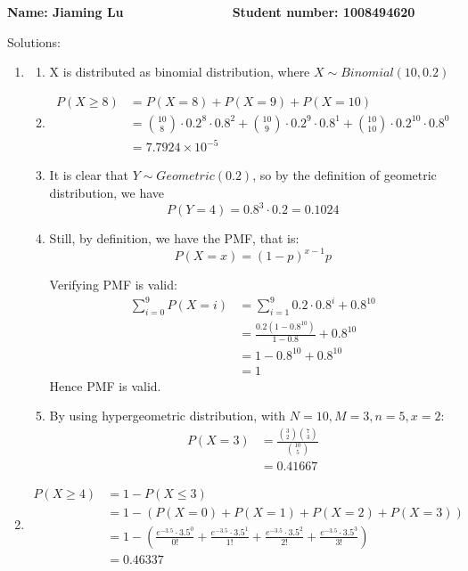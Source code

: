 \documentclass[a4paper, 12pt]{article}
\begin{document}
\textbf{Name: Jiaming Lu $~~~~~~~~~~~~~~~~~~~~~~~~~
~~~~~~~~~~~$ Student number: 1008494620}

Solutions:
\begin{enumerate}
	\item 
\begin{enumerate}
	\item
		X is distributed as binomial distribution, where $X\sim Binomial(10,0.2)$
	\item 
		$$\begin{aligned}
			P(X\geq 8) &= P(X = 8) + P(X = 9) + P(X = 10)\\
					   &= \binom{10}{8}\cdot 0.2^8\cdot0.8^2 + 
					   \binom{10}{9}\cdot 0.2^9\cdot0.8^1 +
					   \binom{10}{10}\cdot 0.2^{10}\cdot0.8^0\\
					   &= 7.7924\times 10^{-5}
		\end{aligned}$$
	\item 
		It is clear that $Y\sim Geometric(0.2)$, so by the definition of 
		geometric distribution, we have
		$$P(Y= 4) = 0.8^3\cdot 0.2 =0.1024$$
	\item 
		Still, by definition, we have the PMF, that is:
		$$P(X = x) = (1-p)^{x-1}p$$

		Verifying PMF is valid:
		$$\begin{aligned}
			\sum^{9}_{i = 0}P(X = i)
			&= \sum^{9}_{i = 1}0.2\cdot 0.8^i + 0.8^{10}\\
			&= \frac{0.2(1-0.8^10)}{1-0.8} + 0.8^{10}\\
			&= 1-0.8^{10} + 0.8^{10}\\
			&= 1
		\end{aligned}$$
		Hence PMF is valid.
	\item
		By using hypergeometric distribution, with $N=10,M=3,n=5,x=2$:
		$$\begin{aligned}
			P(X=3)&= \frac{\binom{3}{2}\binom{7}{3}}{\binom{10}{5}}\\
				  &= 0.41667
		\end{aligned}$$
\end{enumerate}
\item 
	$$\begin{aligned}
		P(X\geq4)&=1-P(X\leq3)\\
				 &= 1-(P(X=0) + P(X = 1) + P(X = 2)+P(X = 3))\\
				 &= 1-(\frac{e^{-3.5}\cdot 3.5^0}{0!}
				 +\frac{e^{-3.5}\cdot 3.5^1}{1!}
				 +\frac{e^{-3.5}\cdot 3.5^2}{2!}
				 +\frac{e^{-3.5}\cdot 3.5^3}{3!})\\
				 &= 0.46337
	\end{aligned}$$
\end{enumerate}
\end{document}
